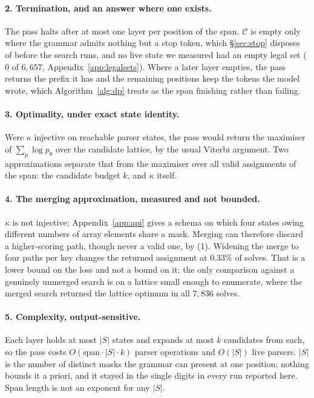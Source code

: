 \paragraph{2. Termination, and an answer where one exists.}
The pass halts after at most one layer per position of the span. $\mathcal{C}$ is
empty only where the grammar admits nothing but a stop token, which
\S\ref{sec:stop} disposes of before the search runs, and no live state we
measured had an empty legal set ($0$ of $6{,}657$,
Appendix~\ref{app:legalsets}). Where a later layer empties, the pass returns the
prefix it has and the remaining positions keep the tokens the model wrote, which
Algorithm~\ref{alg:dp} treats as the span finishing rather than failing.

\paragraph{3. Optimality, under exact state identity.}
Were $\kappa$ injective on reachable parser states, the pass would return the
maximiser of $\sum_p \log p_\theta$ over the candidate lattice, by the usual
Viterbi argument. Two approximations separate that from the maximiser over all
valid assignments of the span: the candidate budget $k$, and $\kappa$ itself.

\paragraph{4. The merging approximation, measured and not bounded.}
$\kappa$ is not injective; Appendix~\ref{app:api} gives a schema on which four
states owing different numbers of array elements share a mask. Merging can
therefore discard a higher-scoring path, though never a valid one, by (1).
Widening the merge to four paths per key changes the returned assignment at
$0.33\%$ of solves. That is a lower bound on the loss and not a bound on it: the
only comparison against a genuinely unmerged search is on a lattice small enough
to enumerate, where the merged search returned the lattice optimum in all
$7{,}836$ solves.

\paragraph{5. Complexity, output-sensitive.}
Each layer holds at most $|S|$ states and expands at most $k$ candidates from
each, so the pass costs $O(\text{span}\cdot|S|\cdot k)$ parser operations and
$O(|S|)$ live parsers. $|S|$ is the number of distinct masks the grammar can
present at one position; nothing bounds it a priori, and it stayed in the single
digits in every run reported here. Span length is not an exponent for any $|S|$.

